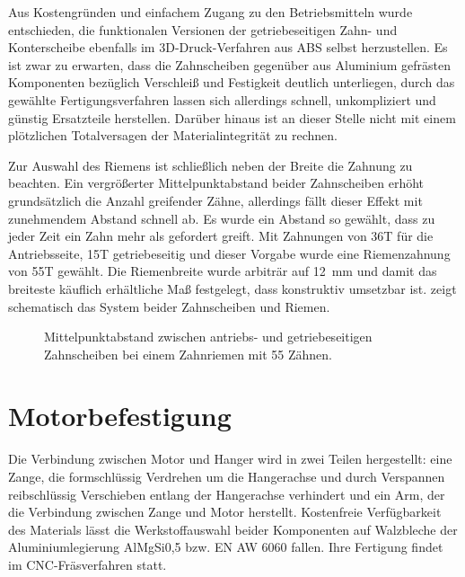 		Aus Kostengründen und einfachem Zugang zu den Betriebsmitteln wurde entschieden, die funktionalen Versionen der getriebeseitigen Zahn- und Konterscheibe ebenfalls im 3D-Druck-Verfahren aus ABS selbst herzustellen.
		Es ist zwar zu erwarten, dass die Zahnscheiben gegenüber aus Aluminium gefrästen Komponenten bezüglich Verschleiß und Festigkeit deutlich unterliegen, durch das gewählte Fertigungsverfahren lassen sich allerdings schnell, unkompliziert und günstig Ersatzteile herstellen.
		Darüber hinaus ist an dieser Stelle nicht mit einem plötzlichen Totalversagen der Materialintegrität zu rechnen.\par\medskip
		Zur Auswahl des Riemens ist schließlich neben der Breite die Zahnung zu beachten.
		Ein vergrößerter Mittelpunktabstand beider Zahnscheiben erhöht grundsätzlich die Anzahl greifender Zähne, allerdings fällt dieser Effekt mit zunehmendem Abstand schnell ab.
		Es wurde ein Abstand so gewählt, dass zu jeder Zeit ein Zahn mehr als gefordert greift.
		Mit Zahnungen von 36T für die Antriebsseite, 15T getriebeseitig und dieser Vorgabe wurde eine Riemenzahnung von 55T gewählt.
		Die Riemenbreite wurde arbiträr auf \qty{12}{\milli\metre} und damit das breiteste käuflich erhältliche Maß festgelegt, dass konstruktiv umsetzbar ist.
		 zeigt schematisch das System beider Zahnscheiben und Riemen.
		\begin{figure}[h]
			\centering
			
			\caption[Mittelpunktabstand zwischen antriebs- und getriebeseitigen Zahnscheiben]{Mittelpunktabstand zwischen antriebs- und getriebeseitigen Zahnscheiben bei einem Zahnriemen mit 55 Zähnen.}%
			\label{fig:timing belt length}
		\end{figure}
	\section{Motorbefestigung}\label{sec:motorbefestigung}
		Die Verbindung zwischen Motor und Hanger wird in zwei Teilen hergestellt: eine Zange, die formschlüssig Verdrehen um die Hangerachse und durch Verspannen reibschlüssig Verschieben entlang der Hangerachse verhindert und ein Arm, der die Verbindung zwischen Zange und Motor herstellt.
		Kostenfreie Verfügbarkeit des Materials lässt die Werkstoffauswahl beider Komponenten auf Walzbleche der Aluminiumlegierung AlMgSi0,5 bzw. EN AW 6060 fallen.
		Ihre Fertigung findet im CNC-Fräsverfahren statt.

